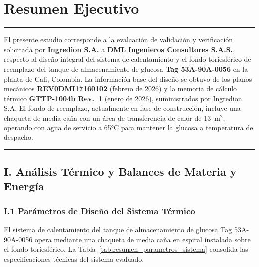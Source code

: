 
\newpage
\section*{Resumen Ejecutivo}

\noindent\rule{\textwidth}{0.5pt}

El presente estudio corresponde a la evaluación de validación y verificación solicitada por \textbf{Ingredion S.A.} a \textbf{DML Ingenieros Consultores S.A.S.}, respecto al diseño integral del sistema de calentamiento y el fondo toriesférico de reemplazo del tanque de almacenamiento de glucosa \textbf{Tag 53A-90A-0056} en la planta de Cali, Colombia. La información base del diseño se obtuvo de los planos mecánicos \textbf{REV0DMI17160102} (febrero de 2026) y la memoria de cálculo térmico \textbf{GTTP-1004b Rev.~1} (enero de 2026), suministrados por Ingredion S.A. El fondo de reemplazo, actualmente en fase de construcción, incluye una chaqueta de media caña con un área de transferencia de calor de 13~m$^2$, operando con agua de servicio a 65°C para mantener la glucosa a temperatura de despacho.

\noindent\rule{\textwidth}{0.5pt}

\subsection*{I. Análisis Térmico y Balances de Materia y Energía}

\subsubsection*{I.1 Parámetros de Diseño del Sistema Térmico}

El sistema de calentamiento del tanque de almacenamiento de glucosa Tag 53A-90A-0056 opera mediante una chaqueta de media caña en espiral instalada sobre el fondo toriesférico. La Tabla~\ref{tab:resumen_parametros_sistema} consolida las especificaciones técnicas del sistema evaluado.

